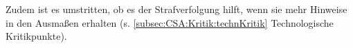 Zudem ist es umstritten, ob es der Strafverfolgung hilft, wenn sie mehr Hinweise in den Ausmaßen erhalten \cite{np:meineck:2022} (s. \autoref{subsec:CSA:Kritik:technKritik} Technologische Kritikpunkte).


%
